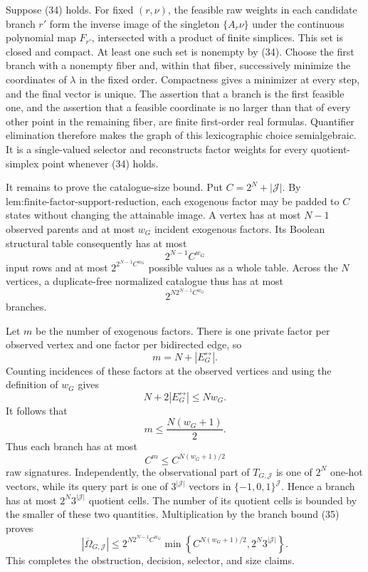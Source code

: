 Suppose (34) holds.  For fixed \((r,\nu)\), the feasible raw weights in each candidate branch \(r'\) form the inverse image of the singleton \(\{A_r\nu\}\) under the continuous polynomial map \(F_{r'}\), intersected with a product of finite simplices.  This set is closed and compact.  At least one such set is nonempty by (34).  Choose the first branch with a nonempty fiber and, within that fiber, successively minimize the coordinates of \(\lambda\) in the fixed order.  Compactness gives a minimizer at every step, and the final vector is unique.  The assertion that a branch is the first feasible one, and the assertion that a feasible coordinate is no larger than that of every other point in the remaining fiber, are finite first-order real formulas.  Quantifier elimination therefore makes the graph of this lexicographic choice semialgebraic.  It is a single-valued selector and reconstructs factor weights for every quotient-simplex point whenever (34) holds.

It remains to prove the catalogue-size bound.  Put \(C=2^N+|\mathcal J|\).  By \(\text{lem:finite-factor-support-reduction}\), each exogenous factor may be padded to \(C\) states without changing the attainable image.  A vertex has at most \(N-1\) observed parents and at most \(w_G\) incident exogenous factors.  Its Boolean structural table consequently has at most
\[
2^{N-1}C^{w_G}
\]
input rows and at most \(2^{2^{N-1}C^{w_G}}\) possible values as a whole table.  Across the \(N\) vertices, a duplicate-free normalized catalogue thus has at most
\[
2^{N2^{N-1}C^{w_G}}
\tag{35}
\]
branches.

Let \(m\) be the number of exogenous factors.  There is one private factor per observed vertex and one factor per bidirected edge, so
\[
m=N+|E_G^{\leftrightarrow}|.
\]
Counting incidences of these factors at the observed vertices and using the definition of \(w_G\) gives
\[
N+2|E_G^{\leftrightarrow}|\le Nw_G.
\]
It follows that
\[
m\le\frac{N(w_G+1)}2.
\tag{36}
\]
Thus each branch has at most
\[
C^m\le C^{N(w_G+1)/2}
\]
raw signatures.  Independently, the observational part of \(T_{G,\mathcal J}\) is one of \(2^N\) one-hot vectors, while its query part is one of \(3^{|\mathcal J|}\) vectors in \(\{-1,0,1\}^{\mathcal J}\).  Hence a branch has at most \(2^N3^{|\mathcal J|}\) quotient cells.  The number of its quotient cells is bounded by the smaller of these two quantities.  Multiplication by the branch bound (35) proves
\[
|\overline\Omega_{G,\mathcal J}|
\le
2^{N2^{N-1}C^{w_G}}
\min\left\{C^{N(w_G+1)/2},2^N3^{|\mathcal J|}\right\}.
\]
This completes the obstruction, decision, selector, and size claims.

